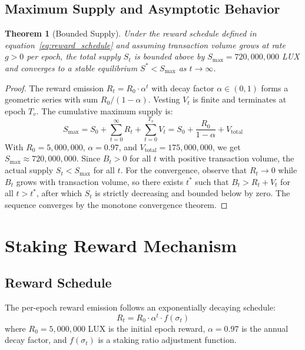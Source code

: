 \documentclass[11pt,a4paper]{article}
\newtheorem{theorem}{Theorem}
\begin{document}
\subsection{Maximum Supply and Asymptotic Behavior}

\begin{theorem}[Bounded Supply]\label{thm:bounded}
Under the reward schedule defined in equation~\eqref{eq:reward_schedule} and assuming transaction volume grows at rate $g > 0$ per epoch, the total supply $S_t$ is bounded above by $S_{\max} = 720{,}000{,}000$ LUX and converges to a stable equilibrium $S^* < S_{\max}$ as $t \to \infty$.
\end{theorem}

\begin{proof}
The reward emission $R_t = R_0 \cdot \alpha^t$ with decay factor $\alpha \in (0,1)$ forms a geometric series with sum $R_0 / (1 - \alpha)$. Vesting $V_t$ is finite and terminates at epoch $T_v$. The cumulative maximum supply is:
\begin{equation}
    S_{\max} = S_0 + \sum_{t=0}^{\infty} R_t + \sum_{t=0}^{T_v} V_t = S_0 + \frac{R_0}{1-\alpha} + V_{\text{total}}
\end{equation}
With $R_0 = 5{,}000{,}000$, $\alpha = 0.97$, and $V_{\text{total}} = 175{,}000{,}000$, we get $S_{\max} \approx 720{,}000{,}000$. Since $B_t > 0$ for all $t$ with positive transaction volume, the actual supply $S_t < S_{\max}$ for all $t$. For the convergence, observe that $R_t \to 0$ while $B_t$ grows with transaction volume, so there exists $t^*$ such that $B_t > R_t + V_t$ for all $t > t^*$, after which $S_t$ is strictly decreasing and bounded below by zero. The sequence converges by the monotone convergence theorem.
\end{proof}

\section{Staking Reward Mechanism}\label{sec:staking}

\subsection{Reward Schedule}

The per-epoch reward emission follows an exponentially decaying schedule:
\begin{equation}\label{eq:reward_schedule}
    R_t = R_0 \cdot \alpha^t \cdot f(\sigma_t)
\end{equation}
where $R_0 = 5{,}000{,}000$ LUX is the initial epoch reward, $\alpha = 0.97$ is the annual decay factor, and $f(\sigma_t)$ is a staking ratio adjustment function.
\end{document}
